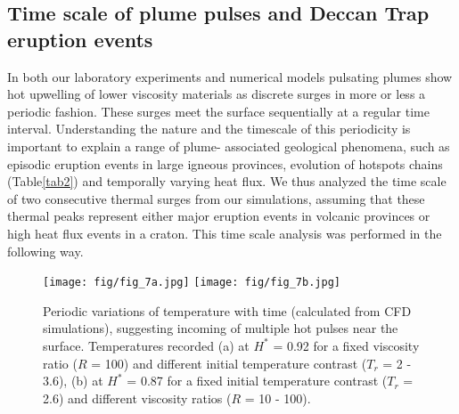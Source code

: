 \documentclass[12pt]{article}
\begin{document}
{\subsection{Time scale of plume pulses and Deccan Trap eruption events}
\label{sec:time_scale} 

In both our laboratory experiments and numerical models pulsating plumes show hot upwelling of lower viscosity materials as discrete surges in more or less a periodic fashion.
These surges meet the surface sequentially at a regular time interval. Understanding the nature and the timescale of this periodicity is important to explain a range of plume- associated geological phenomena, such as episodic eruption events in large igneous provinces, evolution of hotspots chains (Table\ref{tab2}) 
and temporally varying heat flux. We thus analyzed the time scale of two consecutive thermal surges from our simulations, assuming that these thermal peaks represent either major eruption events in volcanic provinces or high heat flux events in a craton. This time scale analysis was performed in the following way.

\begin{figure}[!htb]
 \begin{center}
{\texttt{[image: fig/fig\_7a.jpg]} }
{\texttt{[image: fig/fig\_7b.jpg]} }

\caption{ \small {Periodic variations of temperature with time (calculated from CFD simulations), suggesting incoming of multiple hot pulses near the surface.  Temperatures recorded (a) at $H^*$ = 0.92 for a fixed viscosity ratio ($R$ = 100) and different initial temperature contrast 
($T_r$ = 2 - 3.6), (b) at $H^*$ = 0.87 for a fixed initial temperature contrast ($T_r$ = 2.6) and different viscosity ratios ($R$ = 10 - 100).  }}
\label{fig:fig7}
 \end{center}
\end{figure}

}
\end{document}

